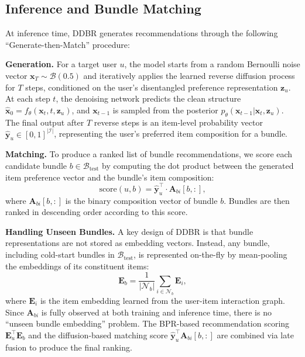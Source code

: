 \documentclass[lettersize,journal]{IEEEtran}
\begin{document}
\subsection{Inference and Bundle Matching}
\label{sec:inference}
At inference time, DDBR generates recommendations through the following ``Generate-then-Match'' procedure:

\noindent\textbf{Generation.}
For a target user $u$, the model starts from a random Bernoulli noise vector $\mathbf{x}_T \sim \mathcal{B}(0.5)$ and iteratively applies the learned reverse diffusion process for $T$ steps, conditioned on the user's disentangled preference representation $\mathbf{z}_u$. At each step $t$, the denoising network predicts the clean structure $\hat{\mathbf{x}}_0 = f_\theta(\mathbf{x}_t, t, \mathbf{z}_u)$, and $\mathbf{x}_{t-1}$ is sampled from the posterior $p_\theta(\mathbf{x}_{t-1} | \mathbf{x}_t, \mathbf{z}_u)$. The final output after $T$ reverse steps is an item-level probability vector $\hat{\mathbf{y}}_u \in [0,1]^{|\mathcal{I}|}$, representing the user's preferred item composition for a bundle.

\noindent\textbf{Matching.}
To produce a ranked list of bundle recommendations, we score each candidate bundle $b \in \mathcal{B}_{\text{test}}$ by computing the dot product between the generated item preference vector and the bundle's item composition:
\begin{equation}
\text{score}(u, b) = \hat{\mathbf{y}}_u^\top \cdot \mathbf{A}_{bi}[b, :],
\end{equation}
where $\mathbf{A}_{bi}[b, :]$ is the binary composition vector of bundle $b$. Bundles are then ranked in descending order according to this score.

\noindent\textbf{Handling Unseen Bundles.}
A key design of DDBR is that bundle representations are not stored as embedding vectors. Instead, any bundle, including cold-start bundles in $\mathcal{B}_{\text{test}}$, is represented on-the-fly by mean-pooling the embeddings of its constituent items: 
\begin{equation}
\mathbf{E}_b = \frac{1}{|\mathcal{N}_b|} \sum_{i \in \mathcal{N}_b} \mathbf{E}_i,
\end{equation} 
where $\mathbf{E}_i$ is the item embedding learned from the user-item interaction graph. Since $\mathbf{A}_{bi}$ is fully observed at both training and inference time, there is no ``unseen bundle embedding'' problem. The BPR-based recommendation scoring $\mathbf{E}_u^\top \mathbf{E}_b$ and the diffusion-based matching score $\hat{\mathbf{y}}_u^\top \mathbf{A}_{bi}[b,:]$ are combined via late fusion to produce the final ranking.
\end{document}
